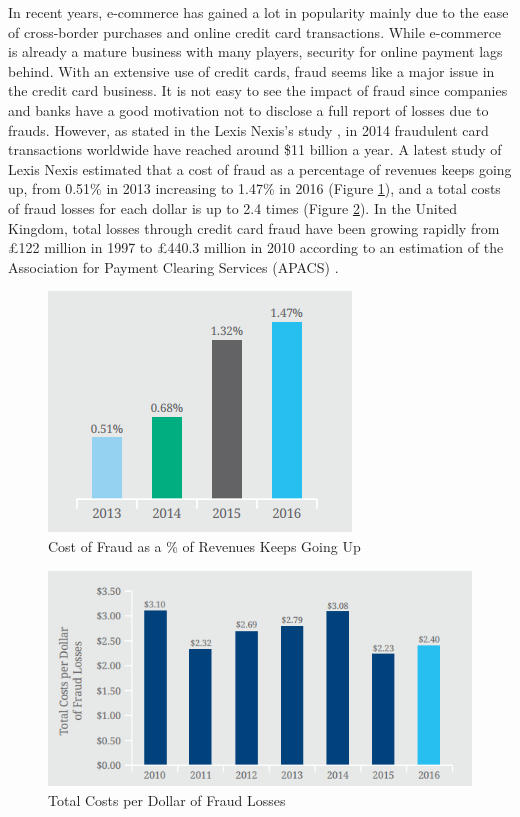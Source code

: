 In recent years, e-commerce has gained a lot in popularity mainly due to the ease of cross-border purchases and online credit card transactions. While e-commerce is already a mature business with many players, security for online payment lags behind. With an extensive use of credit cards, fraud seems like a major issue in the credit card business. It is not easy to see the impact of fraud since companies and banks have a good motivation not to disclose a full report of losses due to frauds. However, as stated in the Lexis Nexis's study \citep{lexisnexis2014}, in 2014 fraudulent card transactions worldwide have reached around \$11 billion a year. A latest study of Lexis Nexis \citep{lexisnexis2016} estimated that a cost of fraud as a percentage of revenues keeps going up, from 0.51\% in 2013 increasing to 1.47\% in 2016 (Figure \ref{cost_of_fraud_as_percentage_revenues}), and a total costs of fraud losses for each dollar is up to 2.4 times (Figure \ref{total_cost_per_dollar}). In the United Kingdom, total losses through credit card fraud have been growing rapidly from £122 million in 1997 to £440.3 million in 2010 according to an estimation of the Association for Payment Clearing Services (APACS) \cite{delamaire2009credit}.


\begin{figure}
\includegraphics[scale=0.8]{Images/cost_of_fraud_as_percentage_of_revenues.png}
\centering
\caption{Cost of Fraud as a \% of Revenues Keeps Going Up \citep{lexisnexis2016}}
\label{cost_of_fraud_as_percentage_revenues}
\end{figure}



\begin{figure}
\includegraphics[width=\textwidth]{Images/total_costs_per_dollar_of_fraud.png}
\centering
\caption{Total Costs per Dollar of Fraud Losses \citep{lexisnexis2016}}
\label{total_cost_per_dollar}
\end{figure}


